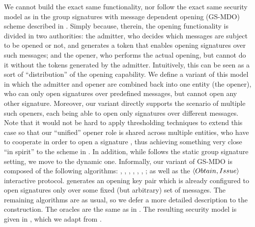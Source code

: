 We cannot build the exact same functionality, nor follow the exact same security
model as in the group signatures with message dependent opening (GS-MDO) scheme
described in \cite{ehk+19}. Simply because, therein, the opening functionality
is divided in two authorities: the admitter, who decides which messages are
subject to be opened or not, and generates a token that enables opening
signatures over such messages; and the opener, who performs the actual opening,
but cannot do it without the tokens generated by the admitter. Intuitively, this
can be seen as a sort of ``distribution'' of the opening capability. We define
a variant of this model in which the admitter and opener are combined back into
one entity (the opener), who can only open signatures over predefined messages,
but cannot open any other signature. Moreover, our variant directly supports the
scenario of multiple such openers, each being able to open only signatures
over different messages. Note that it would not be hard to apply thresholding
techniques to extend this case so that our ``unified'' opener role is shared
across multiple entities, who have to cooperate in order to open a signature
\needcite, thus achieving something very close ``in spirit'' to the scheme in
\cite{ehk+19}. In addition, while \cite{ehk+19} follows the static group
signature setting, we move to the dynamic one. Informally, our variant of GS-MDO
is composed of the following algorithms: \Setup,
\IKeyGen, \OKeyGen, \UKeyGen, \Sign, \Verify, \Open; as well as the $\langle
Obtain, Issue \rangle$ interactive protocol. \OKeyGen generates an opening
key pair which is already configured to open signatures only over some fixed
(but arbitrary) set of messages. The remaining algorithms are as usual, so we
defer a more detailed description to the construction. The oracles are the same
as in \UAS. The resulting security model is given in ,
which we adapt from \cite{ehk+19}.

